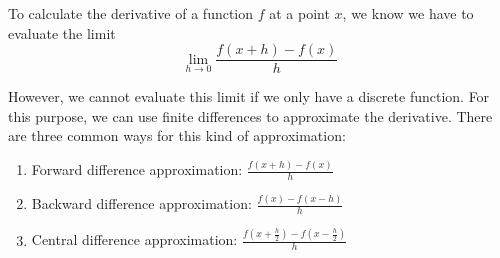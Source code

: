 To calculate the derivative of a function $f$ at a point $x$, we know we have to evaluate the limit 
$$
\lim_{h \rightarrow 0} \frac{f(x+h) - f(x)}{h}
$$

However, we cannot evaluate this limit if we only have a discrete function. For this purpose, we can use finite differences to approximate the derivative. There are three common ways for this kind of approximation:
\begin{enumerate}
    \item Forward difference approximation: $\frac{f(x + h) - f(x)}{h}$
    \item Backward difference approximation: $\frac{f(x) - f(x-h)}{h}$
    \item Central difference approximation: $\frac{f(x + \frac{h}{2}) - f(x - \frac{h}{2})}{h}$
\end{enumerate}

